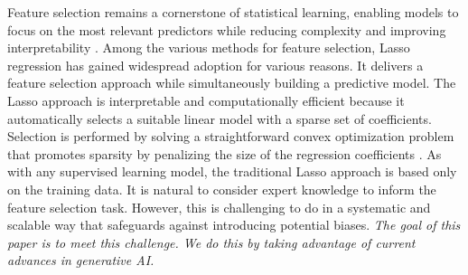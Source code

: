 Feature selection remains a cornerstone of statistical learning, enabling models to focus on the most relevant predictors while reducing complexity and improving interpretability \citep{guyon2007feature, chandrashekar2014survey, li2015feature}. Among the various methods for feature selection, Lasso regression has gained widespread adoption for various reasons. It delivers a feature selection approach while simultaneously building a predictive model. The Lasso approach is interpretable and computationally efficient because it automatically selects a suitable linear model with a sparse set of coefficients. Selection is performed by solving a straightforward convex optimization problem that promotes sparsity by penalizing the size of the regression coefficients \citep{tibshirani1996LASSO, buhlmann2011LASSO,hastie2015statistical}. As with any supervised learning model, the traditional Lasso approach is based only on the training data. It is natural to consider expert knowledge to inform the feature selection task. However, this is challenging to do in a systematic and scalable way that safeguards against introducing potential biases. \textit{The goal of this paper is to meet this challenge. We do this by taking advantage of current advances in generative AI.} 


